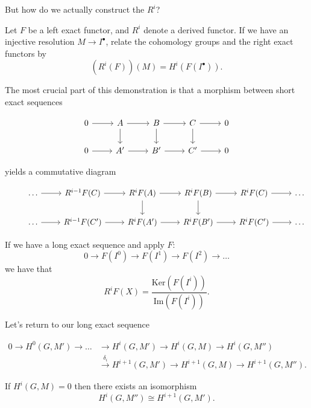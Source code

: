 \documentclass[a4paper, 12pt,oneside,openany]{book}
\begin{document}
But how do we actually construct the $R^i$? 


Let $F$ be a left exact functor, and $R^i$ denote a derived functor. If we have an injective resolution $M \to I^\bullet$, relate the cohomology groups and the right exact functors by $$(R^i(F))(M) = H^i(F(I^\bullet)).$$ 

The most crucial part of this demonstration is that a morphism between short exact sequences 


\[
\begin{tikzcd}
0 \arrow{r} &A \arrow{r}\arrow{d}& B \arrow{r} \arrow{d} &C \arrow{r} \arrow{d} &0 \\
0 \arrow{r} &A' \arrow{r} &B' \arrow{r} &C' \arrow{r} &0
\end{tikzcd}
\]

yields a commutative diagram 

\[
\begin{tikzcd}
&\dots \arrow{r} &R^{i-1}F(C) \arrow{r}& R^iF(A) \arrow{r} \arrow{d} &R^iF(B) \arrow{r} \arrow{d} &R^iF(C) \arrow{r} &\dots \\
&\dots \arrow{r} &R^{i-1}F(C') \arrow{r}& R^iF(A') \arrow{r} &R^iF(B') \arrow{r} &R^iF(C') \arrow{r} &\dots
\end{tikzcd}
\]

If we have a long exact sequence and apply $F$: $$0 \to F(I^0) \to F(I^1) \to F(I^2) \to \dots$$ we have that $$R^iF(X) = \frac{\text{Ker}(F(I^i))}{\text{Im}(F(I^i))}.$$

Let's return to our long exact sequence

\begin{align*}
	0 \to H^0(G, M') \to \dots &\to H^i(G, M') \to H^i(G, M) \to H^i(G, M'')  \\
	&\xrightarrow{\delta_i} H^{i+1}(G, M') \to H^{i+1}(G, M) \to H^{i+1}(G, M'') .
\end{align*}

If $H^i(G, M)=0$ then there exists an isomorphism $$H^i(G, M'') \cong H^{i+1}(G, M').$$

\end{document}
